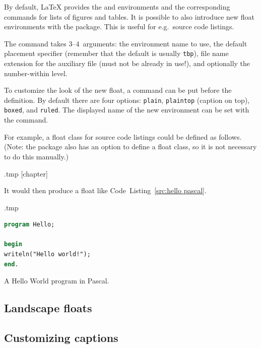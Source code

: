 By default, \LaTeX{} provides the  and  environments
and the corresponding commands for lists of figures and tables.
It is possible to also introduce new float environments with the  package.
This is useful for e.g.\ source code listings.

The  command takes 3--4~arguments:
the environment name to use,
the default placement specifier (remember that the default is usually \verb|tbp|),
file name extension for the auxiliary file (must not be already in use!),
and optionally the number-within level.

To customize the look of the new float,
a  command can be put before the definition.
By default there are four options: \verb|plain|, \verb|plaintop| (caption on top),
\verb|boxed|, and \verb|ruled|.
The displayed name of the new environment can be set with the  command.

For example, a float class for source code listings could be defined as follows.
(Note: the  package also has an option to define a float class,
so it is not necessary to do this manually.)
%
\begin{VerbatimOut}{\jobname.tmp}
[chapter]
\end{VerbatimOut}
\ExecuteExample  

It would then produce a float like Code~Listing~\ref{src:hello pascal}.
%
\begin{VerbatimOut}{\jobname.tmp}
\begin{sourcecode}[h]
\begin{lstlisting}[language=Pascal]
program Hello;

begin
writeln("Hello world!");
end.
\end{lstlisting}
\caption{A Hello World program in Pascal.}
\label{src:hello pascal}
\end{sourcecode}
\end{VerbatimOut}
\ExecuteExample


%
%
\subsection{Landscape floats}



%
%
\subsection{Customizing captions}

